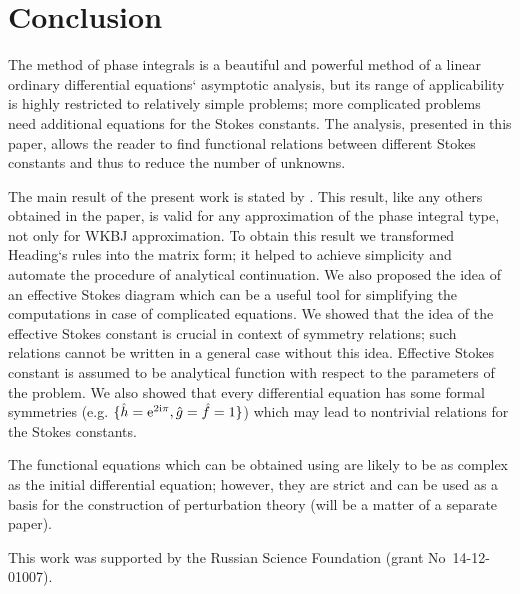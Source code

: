 \documentclass[12pt]{iopart}
\def\f{\hat{f}}
\def\g{\hat{g}}
\def\h{\hat{h}}
\def\unity{1}
\begin{document}
\section{Conclusion \label{sec:cnclsns}}

The method of phase integrals is a beautiful and powerful method of a linear ordinary 
differential equations` asymptotic analysis, but its range of applicability is highly 
restricted to relatively simple problems; more complicated problems need additional equations 
for the Stokes constants. The analysis, presented in this paper, allows the reader to find 
functional relations between different Stokes constants and thus to reduce the number of unknowns.

The main result of the present work is stated by . This result, 
like any others obtained in the paper, is valid for any approximation of the 
phase integral type, not only for WKBJ approximation. To obtain this result 
we transformed Heading`s rules \cite{heading,white} into the matrix form; 
it helped to achieve simplicity and automate the procedure of analytical continuation. 
We also proposed the idea of an effective Stokes diagram which can be a useful tool 
for simplifying the computations in case of complicated equations. 
We showed that the idea of the effective Stokes constant is crucial in context of symmetry relations;
such relations cannot be written in a general case without this idea. 
Effective Stokes constant is assumed to be analytical function with respect to 
the parameters of the problem. 
We also showed that every differential 
equation has some formal symmetries (e.g. $\{\h=\rme^{2\rmi\pi},\g=\f=\unity\}$) which may lead
to nontrivial relations for the Stokes constants. 

The functional equations which can be obtained using  are likely to be as 
complex as the initial differential equation; however, they are strict and can be used as 
a basis for the construction of perturbation theory (will be a matter of a separate paper).

\ack
This work was supported by the Russian Science Foundation (grant No~14-12-01007). 
\end{document}
